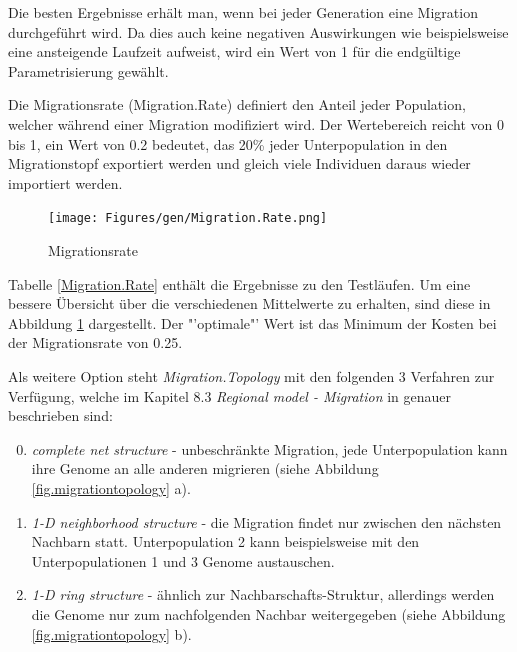 


\noindent Die besten Ergebnisse erhält man, wenn bei jeder Generation eine
Migration durchgeführt wird. Da dies auch keine negativen Auswirkungen wie
beispielsweise eine ansteigende Laufzeit aufweist, wird ein Wert von 1 für die
endgültige Parametrisierung gewählt.


Die Migrationsrate (Migration.Rate) definiert den Anteil jeder Population, welcher
während einer Migration modifiziert wird. Der Wertebereich reicht von 0 bis 1,
ein Wert von 0.2 bedeutet, das 20\% jeder Unterpopulation in den Migrationstopf
exportiert werden und gleich viele Individuen daraus wieder importiert werden.


\begin{figure}[h!]
  \centering
  \texttt{[image: Figures/gen/Migration.Rate.png]}
  \caption{Migrationsrate}\label{fig.migrationrate}
\end{figure}

\noindent Tabelle \ref{Migration.Rate} enthält die Ergebnisse zu den Testläufen.
Um eine bessere Übersicht über die verschiedenen Mittelwerte zu erhalten, sind
diese in Abbildung \ref{fig.migrationrate} dargestellt. Der "'optimale"' Wert
ist das Minimum der Kosten bei der Migrationsrate von 0.25.


Als weitere Option steht \emph{Migration.Topology} mit den folgenden 3 Verfahren
zur Verfügung, welche im Kapitel 8.3 \emph{Regional model - Migration} in
\cite{geatbx-ea} genauer beschrieben sind:
\begin{enumerate}
\setcounter{enumi}{-1} %
\item \emph{complete net structure} - unbeschränkte Migration, jede
      Unterpopulation kann ihre Genome an alle anderen migrieren (siehe Abbildung
      \ref{fig.migrationtopology} a).
\item \emph{1-D neighborhood structure} - die Migration findet nur zwischen den
      nächsten Nachbarn statt. Unterpopulation 2 kann beispielsweise mit den
      Unterpopulationen 1 und 3 Genome austauschen.
\item \emph{1-D ring structure} - ähnlich zur Nachbarschafts-Struktur, allerdings
      werden die Genome nur zum nachfolgenden Nachbar weitergegeben (siehe Abbildung
      \ref{fig.migrationtopology} b).
\end{enumerate}

